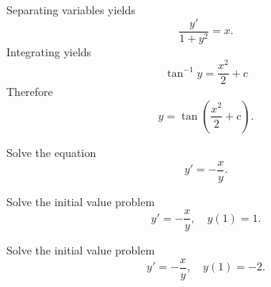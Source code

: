 \begin{examplesolution}
\solution Separating variables yields
\[
  \frac{y'}{1+y^{2}}=x.
\]
Integrating yields
\[
  \tan^{-1}y=\frac{x^{2}}{2}+c
\]
Therefore
\[
  y=\tan\left(\frac{x^{2}}{2}+c\right).
\]
\end{examplesolution}

\begin{example}
  \label{example:2.2.2} \rm \mbox{}
  \newline
  \begin{alist}
    \item %
    Solve the equation
    \begin{equation}
      \label{eq:2.2.4}y'=-\frac{x}{y}.
    \end{equation}

    \item %
    Solve the initial value problem
    \begin{equation}
      \label{eq:2.2.5}y'=-\frac{x}{y},\quad y(1)=1.
    \end{equation}

    \item %
    Solve the initial value problem
    \begin{equation}
      \label{eq:2.2.6}y'=-\frac{x}{y},\quad y(1)=-2.
    \end{equation}
  \end{alist}
\end{example}

